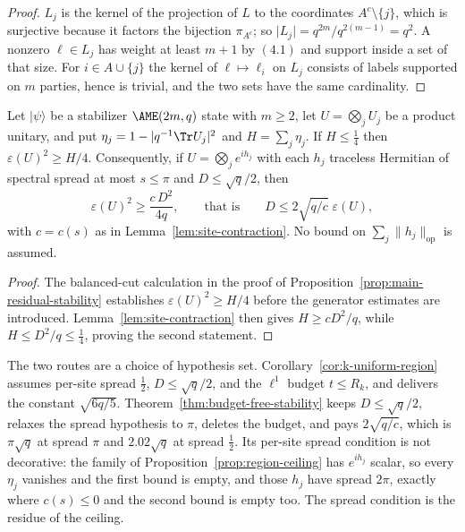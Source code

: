 \begin{proof}
\(L_j\) is the kernel of the projection of \(L\) to the coordinates
\(A^c\setminus\{j\}\), which is surjective because it factors the bijection
\(\pi_{A^c}\); so \(\lvert L_j\rvert=q^{2m}/q^{2(m-1)}=q^2\).  A nonzero
\(\ell\in L_j\) has weight at least \(m+1\) by \((4.1)\) and support inside
a set of that size.  For \(i\in A\cup\{j\}\) the kernel of
\(\ell\mapsto\ell_i\) on \(L_j\) consists of labels supported on \(m\)
parties, hence is trivial, and the two sets have the same cardinality.
\end{proof}

\begin{theorem}
\label{thm:budget-free-stability}
Let \(\lvert\psi\rangle\) be a stabilizer \(\AME(2m,q)\) state with
\(m\geq2\), let \(U=\bigotimes_jU_j\) be a product unitary, and put
\(\eta_j=1-\lvert q^{-1}\Tr U_j\rvert^2\) and \(H=\sum_j\eta_j\).  If
\(H\leq\frac14\) then \(\varepsilon(U)^2\geq H/4\).  Consequently, if
\(U=\bigotimes_je^{ih_j}\) with each \(h_j\) traceless Hermitian of
spectral spread at most \(s\leq\pi\) and \(D\leq\sqrt q/2\), then
\[
 \varepsilon(U)^2\geq\frac{c\,D^2}{4q},
 \qquad\text{that is}\qquad
 D\leq2\sqrt{q/c}\;\varepsilon(U),
\]
with \(c=c(s)\) as in Lemma~\ref{lem:site-contraction}.  No bound on
\(\sum_j\lVert h_j\rVert_{\mathrm{op}}\) is assumed.
\end{theorem}

\begin{proof}
The balanced-cut calculation in the proof of
Proposition~\ref{prop:main-residual-stability} establishes
\(\varepsilon(U)^2\geq H/4\) before the generator estimates are introduced.
Lemma~\ref{lem:site-contraction} then gives
\(H\geq cD^2/q\), while
\(H\leq D^2/q\leq\frac14\), proving the second statement.
\end{proof}

The two routes are a choice of hypothesis set.
Corollary~\ref{cor:k-uniform-region} assumes per-site spread \(\frac12\),
\(D\leq\sqrt q/2\), and the \(\ell^1\) budget \(t\leq R_k\), and delivers
the constant \(\sqrt{6q/5}\).  Theorem~\ref{thm:budget-free-stability}
keeps \(D\leq\sqrt q/2\), relaxes the spread hypothesis to \(\pi\), deletes
the budget, and pays \(2\sqrt{q/c}\), which is \(\pi\sqrt q\) at spread
\(\pi\) and \(2.02\sqrt q\) at spread \(\frac12\).  Its per-site spread
condition is not decorative: the family of
Proposition~\ref{prop:region-ceiling} has \(e^{ih_j}\) scalar, so every
\(\eta_j\) vanishes and the first bound is empty, and those \(h_j\) have
spread \(2\pi\), exactly where \(c(s)\leq0\) and the second bound is empty
too.  The spread condition is the residue of the ceiling.

